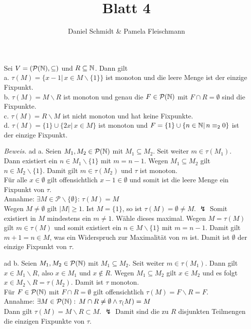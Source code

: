 \documentclass[12pt,a4paper]{amsart}
\begin{document}
\title{Blatt 4}

\author{Daniel Schmidt \& Pamela Fleischmann}

\maketitle

\begin{aufgabe1}
Sei $V=(\mathcal{P}(\mathbb{N}),\subseteq)$ und $R\subseteq\mathbb{N}$. Dann gilt\\
a. $\tau(M)=\{x-1|\,x\in M\backslash\{1\}\}$ ist monoton und die leere Menge ist der einzige Fixpunkt.\\
b. $\tau(M)=M\backslash R$ ist monoton und genau die $F\in\mathcal{P}(\mathbb{N})$ mit $F\cap R=\emptyset$ sind die Fixpunkte.\\
c. $\tau(M)=R\backslash M$ ist nicht monoton und hat keine Fixpunkte.\\
d. $\tau(M)=\{1\}\cup\{2x|\,x\in M\}$ ist monoton und $F=\{1\}\cup\{n\in\mathbb{N}|\,n\equiv_20\}$ ist der einzige Fixpunkt.
\end{aufgabe1}

\medskip

{\em Beweis.}
ad a. Seien $M_1,M_2\in\mathcal{P}(\mathbb{N})$ mit $M_1\subseteq M_2$. Seit weiter $m\in\tau(M_1)$. Dann existiert ein $n\in M_1\backslash\{1\}$ mit
$m=n-1$. Wegen $M_1\subseteq M_2$ gilt $n\in M_2\backslash\{1\}$. Damit gilt $m\in\tau(M_2)$ und $\tau$ ist monoton.\\
Für alle $x\in\emptyset$ gilt offensichtlich $x-1\in\emptyset$ und somit ist die leere Menge ein Fixpunkt von $\tau$.\\
Annahme: $\exists M\in\mathcal{P}\backslash\{\emptyset\}:\,\tau(M)=M$\\
Wegen $M\neq\emptyset$ gilt $|M|\geq 1$. Ist $M=\{1\}$, so ist $\tau(M)=\emptyset\neq M$. $\lightning$ Somit existiert in $M$ mindestens ein $m\neq 1$. Wähle
dieses maximal. Wegen $M=\tau(M)$ gilt $m\in\tau(M)$ und somit existiert ein $n\in M\backslash\{1\}$ mit $m=n-1$. Damit gilt $m+1=n\in M$, was ein Widerspruch zur
Maximalität von $m$ ist. Damit ist $\emptyset$ der einzige Fixpunkt von $\tau$.

\medskip

ad b. Seien $M_1,M_2\in\mathcal{P}(\mathbb{N})$ mit $M_1\subseteq M_2$. Seit weiter $m\in\tau(M_1)$. Dann gilt $x\in M_1\backslash R$, also $x\in M_1$ und $x\not\in R$.
Wegen $M_1\subseteq M_2$ gilt $x\in M_2$ und es folgt $x\in M_2\backslash R=\tau(M_2)$. Damit ist $\tau$ monoton.\\
Für $F\in\mathcal{P}(\mathbb{N})$ mit $F\cap R=\emptyset$ gilt offensichtlich $\tau(M)=F\backslash R =F$. \\
Annahme: $\exists M\in\mathcal{P}(\mathbb{N}):\,M\cap R\neq\emptyset\land \tau_(M)=M$\\
Dann gilt $\tau(M)=M\backslash R\subset M$. $\lightning$ Damit sind die zu $R$ disjunkten Teilmengen die einzigen Fixpunkte von $\tau$.
\end{document}
